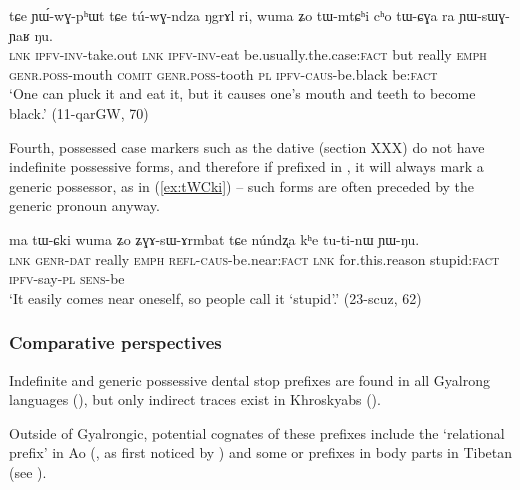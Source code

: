\begin{exe}
\ex  \label{ex:genr.tWmtChi}
\gll
tɕe ɲɯ́-wɣ-pʰɯt tɕe tú-wɣ-ndza ŋgrɤl ri, wuma ʑo tɯ-mtɕʰi cʰo tɯ-ɕɣa ra ɲɯ-sɯɣ-ɲaʁ ŋu. \\
\textsc{lnk} \textsc{ipfv}-\textsc{inv}-take.out \textsc{lnk} \textsc{ipfv}-\textsc{inv}-eat be.usually.the.case:\textsc{fact} but really \textsc{emph}  \textsc{genr.poss}-mouth \textsc{comit} \textsc{genr.poss}-tooth \textsc{pl}  \textsc{ipfv}-\textsc{caus}-be.black be:\textsc{fact} \\
\glt `One can pluck it and eat it, but it causes one's mouth and teeth to become black.' (11-qarGW, 70) 
\end{exe}

Fourth, possessed case markers such as the dative  (section XXX) do not have indefinite possessive forms, and therefore if prefixed in , it will always mark a generic possessor, as in (\ref{ex:tWCki}) -- such forms are often preceded by the generic pronoun  anyway.

\begin{exe}
\ex  \label{ex:tWCki}
\gll ma tɯ-ɕki wuma ʑo ʑɣɤ-sɯ-ɤrmbat tɕe núndʐa kʰe tu-ti-nɯ ɲɯ-ŋu. \\
\textsc{lnk} \textsc{genr-dat} really \textsc{emph} \textsc{refl}-\textsc{caus}-be.near:\textsc{fact} \textsc{lnk} for.this.reason stupid:\textsc{fact} \textsc{ipfv}-say-\textsc{pl} \textsc{sens}-be \\
\glt `It easily comes near oneself, so people call it `stupid'.' (23-scuz, 62) 
\end{exe}

\subsubsection{Comparative perspectives} \label{sec:indef.t.comparative}
Indefinite and generic possessive dental stop prefixes are found in all Gyalrong languages (\citealt{jackson98morphology}), but only indirect traces exist in Khroskyabs  (\citealt[155]{lai17khroskyabs}). 

Outside of Gyalrongic, potential cognates of these prefixes include the `relational prefix'  in Ao (\citealt[84-85]{coupe07mongsen}, as first noticed by \citealt[141-2]{wolfenden29outlines}) and some  or  prefixes in body parts in Tibetan (see \citealt{jacques14snom}).

